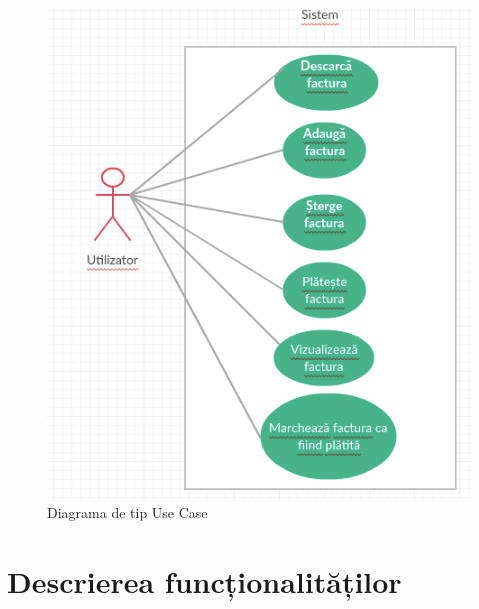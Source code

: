 \documentclass[12pt]{book}
\begin{document}
\begin{figure}[!ht]
	\centering
	\includegraphics{UseCaseDiagram}
	\caption{Diagrama de tip Use Case}
\end{figure}

\section{Descrierea funcționalităților}
\end{document}

